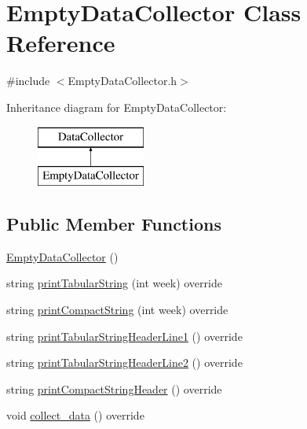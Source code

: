 \hypertarget{classEmptyDataCollector}{}\section{Empty\+Data\+Collector Class Reference}
\label{classEmptyDataCollector}


{\ttfamily \#include $<$Empty\+Data\+Collector.\+h$>$}

Inheritance diagram for Empty\+Data\+Collector\+:\begin{figure}[H]
\begin{center}
\leavevmode
\includegraphics[height=2.000000cm]{classEmptyDataCollector}
\end{center}
\end{figure}
\subsection*{Public Member Functions}
\begin{DoxyCompactItemize}
\item 
\mbox{\hyperlink{classEmptyDataCollector_ae6ec59ac659f009c76525f00c5319524_ae6ec59ac659f009c76525f00c5319524}{Empty\+Data\+Collector}} ()
\item 
string \mbox{\hyperlink{classEmptyDataCollector_a2bb44e454376ed518c4d89cf324b8bd7_a2bb44e454376ed518c4d89cf324b8bd7}{print\+Tabular\+String}} (int week) override
\item 
string \mbox{\hyperlink{classEmptyDataCollector_ad4a4ebbf610b3939e34442795a392dd5_ad4a4ebbf610b3939e34442795a392dd5}{print\+Compact\+String}} (int week) override
\item 
string \mbox{\hyperlink{classEmptyDataCollector_afa47b48abb2ed59c16f1253e55f93cf2_afa47b48abb2ed59c16f1253e55f93cf2}{print\+Tabular\+String\+Header\+Line1}} () override
\item 
string \mbox{\hyperlink{classEmptyDataCollector_aa71282121251d344d674223409445be9_aa71282121251d344d674223409445be9}{print\+Tabular\+String\+Header\+Line2}} () override
\item 
string \mbox{\hyperlink{classEmptyDataCollector_a345d478e92af2ab4bcbaeeae3c7a3faa_a345d478e92af2ab4bcbaeeae3c7a3faa}{print\+Compact\+String\+Header}} () override
\item 
void \mbox{\hyperlink{classEmptyDataCollector_a2993f4e00acd2eff18bed2e39108e89f_a2993f4e00acd2eff18bed2e39108e89f}{collect\+\_\+data}} () override
\end{DoxyCompactItemize}
